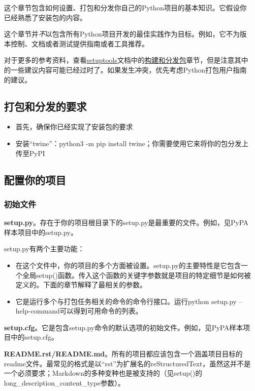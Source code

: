 \documentclass[../package_guide.tex]{subfiles}
\begin{document}
这个章节包含如何设置、打包和分发你自己的Python项目的基本知识。它假设你已经熟悉了安装包的内容。

这个章节并\textit{不}以包含所有Python项目开发的最佳实践作为目标。例如，它不为版本控制、文档或者测试提供指南或者工具推荐。

对于更多的参考资料，查看\href{https://packaging.python.org/key_projects/#setuptools}{setuptools}文档中的\href{https://setuptools.pypa.io/en/latest/userguide/index.html}{构建和分发包}章节，但是注意其中的一些建议内容可能已经过时了。如果发生冲突，优先考虑Python打包用户指南的建议。

\subsection{打包和分发的要求}

\begin{itemize}
    \item 首先，确保你已经实现了安装包的要求
    \item 安装“twine”：python3 -m pip install twine；你需要使用它来将你的包分发上传至PyPI
\end{itemize}

\subsection{配置你的项目}

\subsubsection{初始文件}

\textbf{setup.py}。存在于你的项目根目录下的setup.py是最重要的文件。例如，见PyPA样本项目中的setup.py。

setup.py有两个主要功能：
\begin{itemize}
    \item 在这个文件中，你的项目的多个方面被设置。setup.py的主要特性是它包含一个全局setup()函数。传入这个函数的关键字参数就是项目的特定细节是如何被定义的。下面的章节解释了最相关的参数。
    \item 它是运行多个与打包任务相关的命令的命令行接口。运行python setup.py --help-command可以得到可用命令的列表。
\end{itemize}

\textbf{setup.cfg}。它是包含setup.py命令的默认选项的初始文件。例如，见PyPA样本项目中的setup.cfg。

\textbf{README.rst/README.md}。所有的项目都应该包含一个涵盖项目目标的readme文件。最常见的格式是以“rst”为扩展名的reStructuredText，虽然这并不是一个必须要求；Markdown的多种变种也是被支持的（见setup()的long\_description\_content\_type参数）。
\end{document}
